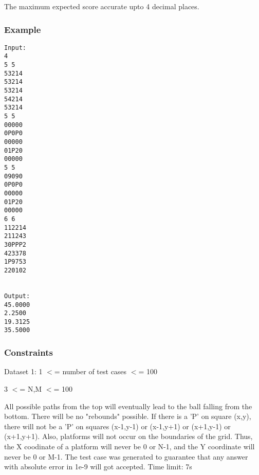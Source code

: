    The maximum expected score accurate upto 4 decimal places.  

\subsubsection{   Example  }
\begin{verbatim}
Input:
4
5 5
53214
53214
53214
54214
53214
5 5
00000
0P0P0
00000
01P20
00000
5 5
09090
0P0P0
00000
01P20
00000
6 6
112214
211243
30PPP2
423378
1P9753
220102


Output:
45.0000
2.2500
19.3125
35.5000

\end{verbatim}

\subsubsection{   Constraints  }

   Dataset 1: 1 $<$= number of test cases $<$= 100  

   3 $<$= N,M $<$= 100  

   All possible paths from the top will eventually lead to the ball falling from the bottom. There will be no "rebounds" possible. If there is a 'P' on square (x,y), there will not be a 'P' on squares (x-1,y-1) or (x-1,y+1) or (x+1,y-1) or (x+1,y+1). Also, platforms will not occur on the boundaries of the grid. Thus, the X coodinate of a platform will never be 0 or N-1, and the Y coordinate will never be 0 or M-1. The test case was generated to guarantee that any answer with absolute error in 1e-9 will got accepted. Time limit: 7s  